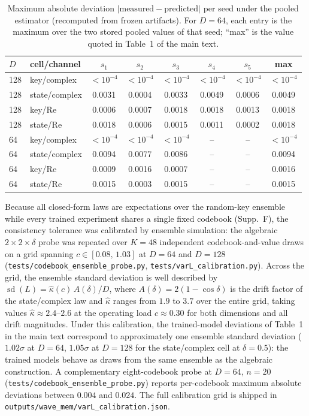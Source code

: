 \documentclass[11pt,a4paper]{article}
\begin{document}
\begin{table}[h]
  \centering
  \caption{Maximum absolute deviation $|\text{measured}-\text{predicted}|$ per seed under the pooled estimator (recomputed from frozen artifacts). For $D=64$, each entry is the maximum over the two stored pooled values of that seed; ``max'' is the value quoted in Table~1 of the main text.}
  \label{tab:perseed}
  \vspace{0.5em}
  \begin{tabular}{@{}llcccccc@{}}
    \toprule
    $D$ & cell/channel & $s_1$ & $s_2$ & $s_3$ & $s_4$ & $s_5$ & max \\
    \midrule
    128 & key/complex     & $<10^{-4}$ & $<10^{-4}$ & $<10^{-4}$ & $<10^{-4}$ & $<10^{-4}$ & $<10^{-4}$ \\
    128 & state/complex   & 0.0031 & 0.0004 & 0.0033 & 0.0049 & 0.0006 & 0.0049 \\
    128 & key/Re          & 0.0006 & 0.0007 & 0.0018 & 0.0018 & 0.0013 & 0.0018 \\
    128 & state/Re        & 0.0018 & 0.0006 & 0.0015 & 0.0011 & 0.0002 & 0.0018 \\
    \midrule
    64  & key/complex     & $<10^{-4}$ & $<10^{-4}$ & $<10^{-4}$ & -- & -- & $<10^{-4}$ \\
    64  & state/complex   & 0.0094 & 0.0077 & 0.0086 & -- & -- & 0.0094 \\
    64  & key/Re          & 0.0009 & 0.0016 & 0.0007 & -- & -- & 0.0016 \\
    64  & state/Re        & 0.0015 & 0.0003 & 0.0015 & -- & -- & 0.0015 \\
    \bottomrule
  \end{tabular}
\end{table}

Because all closed-form laws are expectations over the random-key ensemble while every trained experiment shares a single fixed codebook (Supp.~F), the consistency tolerance was calibrated by ensemble simulation: the algebraic $2\times2\times\delta$ probe was repeated over $K=48$ independent codebook-and-value draws on a grid spanning $c \in [0.08,\,1.03]$ at $D=64$ and $D=128$ (\texttt{tests/codebook\_ensemble\_probe.py}, \texttt{tests/varL\_calibration.py}). Across the grid, the ensemble standard deviation is well described by $\operatorname{sd}(L) = \hat{\kappa}(c)\,A(\delta)/D$, where $A(\delta)=2(1-\cos\delta)$ is the drift factor of the state/complex law and $\hat{\kappa}$ ranges from $1.9$ to $3.7$ over the entire grid, taking values $\hat{\kappa} \approx 2.4$--$2.6$ at the operating load $c \approx 0.30$ for both dimensions and all drift magnitudes. Under this calibration, the trained-model deviations of Table~1 in the main text correspond to approximately one ensemble standard deviation ($1.02\sigma$ at $D=64$, $1.05\sigma$ at $D=128$ for the state/complex cell at $\delta=0.5$): the trained models behave as draws from the same ensemble as the algebraic construction. A complementary eight-codebook probe at $D=64$, $n=20$ (\texttt{tests/codebook\_ensemble\_probe.py}) reports per-codebook maximum absolute deviations between $0.004$ and $0.024$. The full calibration grid is shipped in \texttt{outputs/wave\_mem/varL\_calibration.json}.
\end{document}
